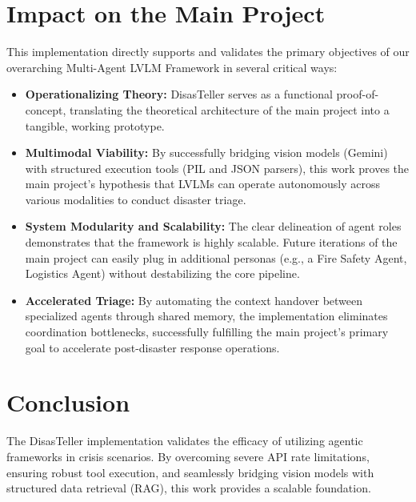 \documentclass[conference,twocolumn,twoside]{IEEEtran}
\begin{document}
\section{Impact on the Main Project}
This implementation directly supports and validates the primary objectives of our overarching Multi-Agent LVLM Framework in several critical ways:
\begin{itemize}
    \item \textbf{Operationalizing Theory:} DisasTeller serves as a functional proof-of-concept, translating the theoretical architecture of the main project into a tangible, working prototype.
    \item \textbf{Multimodal Viability:} By successfully bridging vision models (Gemini) with structured execution tools (PIL and JSON parsers), this work proves the main project's hypothesis that LVLMs can operate autonomously across various modalities to conduct disaster triage.
    \item \textbf{System Modularity and Scalability:} The clear delineation of agent roles demonstrates that the framework is highly scalable. Future iterations of the main project can easily plug in additional personas (e.g., a Fire Safety Agent, Logistics Agent) without destabilizing the core pipeline.
    \item \textbf{Accelerated Triage:} By automating the context handover between specialized agents through shared memory, the implementation eliminates coordination bottlenecks, successfully fulfilling the main project's primary goal to accelerate post-disaster response operations.
\end{itemize}

\section{Conclusion}
The DisasTeller implementation validates the efficacy of utilizing agentic frameworks in crisis scenarios. By overcoming severe API rate limitations, ensuring robust tool execution, and seamlessly bridging vision models with structured data retrieval (RAG), this work provides a scalable foundation.
\end{document}
